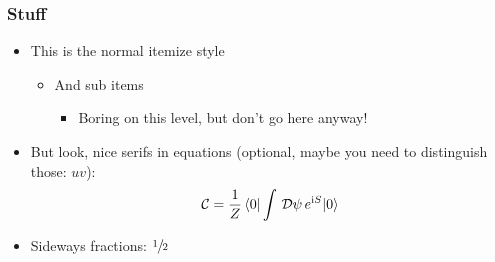 \documentclass[mathserif, fleqn]{beamer}
\begin{document}
\begin{frame}\frametitle{Stuff}
  \begin{itemize}
  \item This is the normal itemize style
    \begin{itemize}
    \item And sub items
      \begin{itemize}
      \item Boring on this level, but don't go here anyway!
      \end{itemize}
    \end{itemize}

  \item But look, nice serifs in equations (optional, maybe you need to distinguish those: $uv$):
    \begin{align*}
      \mathcal{C} = \frac1{Z} \braket{0|\int\,\mathcal{D}\psi\,e^{\mathrm{i} S}|0}
    \end{align*}

  \item Sideways fractions: $\sfrac{1}{2}$
  \end{itemize}
\end{frame}
\end{document}
